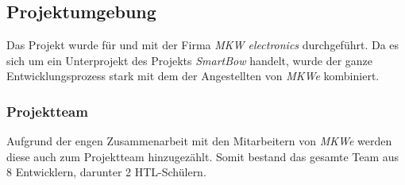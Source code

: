 \subsection{Projektumgebung}
Das Projekt wurde für und mit der Firma \textit{MKW electronics} durchgeführt. Da es sich um ein Unterprojekt des Projekts \textit{SmartBow} handelt, wurde der ganze Entwicklungsprozess stark mit dem der Angestellten von \textit{MKWe} kombiniert.

\subsubsection{Projektteam}
Aufgrund der engen Zusammenarbeit mit den Mitarbeitern von \textit{MKWe} werden diese auch zum Projektteam hinzugezählt. Somit bestand das gesamte Team aus 8 Entwicklern, darunter 2 HTL-Schülern.

